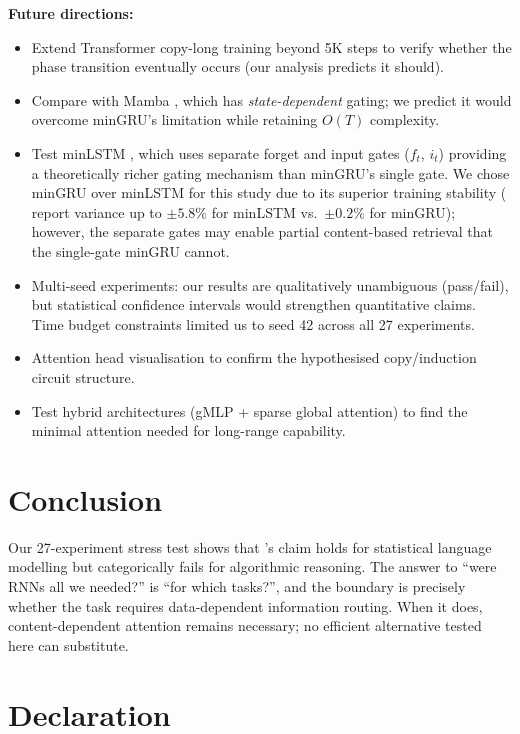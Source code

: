 \documentclass[10pt,a4paper]{article}
\begin{document}
\textbf{Future directions:}
\begin{itemize}
    \item Extend Transformer copy-long training beyond 5K steps to verify whether the phase transition eventually occurs (our analysis predicts it should).
    \item Compare with Mamba \citep{gu2023mamba}, which has \emph{state-dependent} gating; we predict it would overcome minGRU's limitation while retaining $O(T)$ complexity.
    \item Test minLSTM \citep{feng2024were}, which uses separate forget and input gates ($f_t$, $i_t$) providing a theoretically richer gating mechanism than minGRU's single gate. We chose minGRU over minLSTM for this study due to its superior training stability (\citeauthor{feng2024were} report variance up to $\pm 5.8\%$ for minLSTM vs.\ $\pm 0.2\%$ for minGRU); however, the separate gates may enable partial content-based retrieval that the single-gate minGRU cannot.
    \item Multi-seed experiments: our results are qualitatively unambiguous (pass/fail), but statistical confidence intervals would strengthen quantitative claims. Time budget constraints limited us to seed 42 across all 27 experiments.
    \item Attention head visualisation to confirm the hypothesised copy/induction circuit structure.
    \item Test hybrid architectures (gMLP + sparse global attention) to find the minimal attention needed for long-range capability.
\end{itemize}

\section{Conclusion}

Our 27-experiment stress test shows that \citeauthor{feng2024were}'s claim holds for statistical language modelling but categorically fails for algorithmic reasoning. The answer to ``were RNNs all we needed?'' is ``for which tasks?'', and the boundary is precisely whether the task requires data-dependent information routing. When it does, content-dependent attention remains necessary; no efficient alternative tested here can substitute.




\section*{Declaration}
\end{document}
